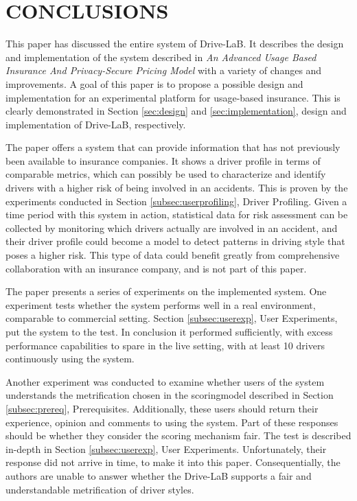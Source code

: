 \section{CONCLUSIONS}\label{sec:conclusion}
This paper has discussed the entire system of Drive-LaB. It describes the design and implementation of the system described in \textit{An Advanced Usage Based Insurance And Privacy-Secure Pricing Model} \citep{sw9_report} with a variety of changes and improvements. A goal of this paper is to propose a possible design and implementation for an experimental platform for usage-based insurance. This is clearly demonstrated in Section \ref{sec:design} and \ref{sec:implementation}, design and implementation of Drive-LaB, respectively.

The paper offers a system that can provide information that has not previously been available to insurance companies. It shows a driver profile in terms of comparable metrics, which can possibly be used to characterize and identify drivers with a higher risk of being involved in an accidents. This is proven by the experiments conducted in Section \ref{subsec:userprofiling}, Driver Profiling. Given a time period with this system in action, statistical data for risk assessment can be collected by monitoring which drivers actually are involved in an accident, and their driver profile could become a model to detect patterns in driving style that poses a higher risk. This type of data could benefit greatly from comprehensive collaboration with an insurance company, and is not part of this paper.

The paper presents a series of experiments on the implemented system. One experiment tests whether the system performs well in a real environment, comparable to commercial setting. Section \ref{subsec:userexp}, User Experiments, put the system to the test. In conclusion it performed sufficiently, with excess performance capabilities to spare in the live setting, with at least 10 drivers continuously using the system.

Another experiment was conducted to examine whether users of the system understands the metrification chosen in the scoringmodel described in Section \ref{subsec:prereq}, Prerequisites. Additionally, these users should return their experience, opinion and comments to using the system. Part of these responses should be whether they consider the scoring mechanism fair. The test is described in-depth in Section \ref{subsec:userexp}, User Experiments. Unfortunately, their response did not arrive in time, to make it into this paper. Consequentially, the authors are unable to answer whether the Drive-LaB supports a fair and understandable metrification of driver styles. 

